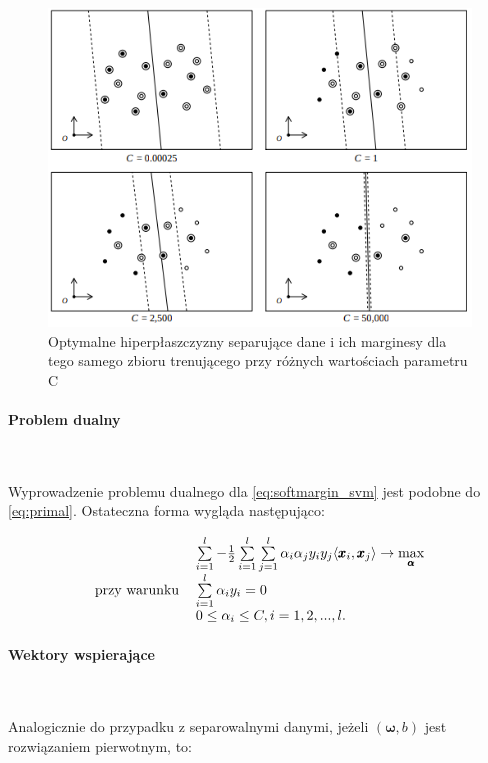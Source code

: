 \documentclass[paper=a4, fontsize=11pt]{scrartcl} %
\newcommand{\myparagraph}[1]{\paragraph{#1}\mbox{}\\}
\numberwithin{equation}{section} %
\numberwithin{figure}{section} %
\begin{document}
    \begin{figure}[H] 
        \begin{center}
            \includegraphics[scale=0.8]{./img/param_c_change.png}
            \caption{Optymalne hiperpłaszczyzny separujące dane i ich marginesy dla tego samego
            zbioru trenującego przy różnych wartościach parametru C \cite{nefedov2016support}}
            \label{fig:param_c_change}
        \end{center}
    \end{figure}

\myparagraph{Problem dualny}
    \par Wyprowadzenie problemu dualnego dla \ref{eq:softmargin_svm} jest podobne do
    \ref{eq:primal}. Ostateczna forma wygląda następująco:

    \begin{equation}
        \begin{tabular}{rl}
            & $\sum\limits_{i=1}^{l} -
            \frac{1}{2}\sum\limits_{i=1}^{l}\sum\limits_{j=1}^{l}\alpha_i\alpha_j y_i y_j
            \langle \pmb{x}_i, \pmb{x}_j \rangle \rightarrow \max\limits_{\pmb{\alpha}}$ \\
            przy warunku
            & $\sum\limits_{i=1}^{l}\alpha_i y_i = 0$ \\
            & $ 0 \leq \alpha_i \leq C, i=1,2,...,l$.
        \end{tabular}
    \end{equation}

\myparagraph{Wektory wspierające}
    \par Analogicznie do przypadku z separowalnymi danymi, jeżeli $(\pmb{\omega},b)$ jest
    rozwiązaniem pierwotnym, to:
\end{document}
